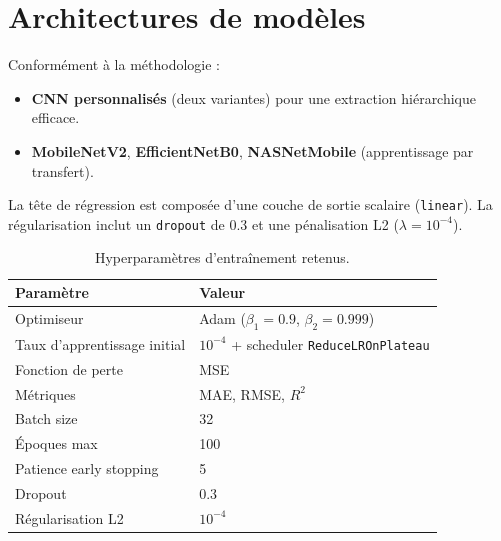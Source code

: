 \section{Architectures de modèles}
\label{sec:modeles}

Conformément à la méthodologie :
\begin{itemize}
	\item \textbf{CNN personnalisés} (deux variantes) pour une extraction hiérarchique efficace.
	\item \textbf{MobileNetV2}, \textbf{EfficientNetB0}, \textbf{NASNetMobile} (apprentissage par transfert).
\end{itemize}

La tête de régression est composée d’une couche de sortie scalaire (\texttt{linear}).
La régularisation inclut un \texttt{dropout} de 0.3 et une pénalisation L2 (\(\lambda=10^{-4}\)).

\begin{table}[h!]
	\centering
	\caption{Hyperparamètres d’entraînement retenus.}
	\label{tab:hyperparams}
	\begin{tabular}{l l}
		\toprule
		Paramètre                    & Valeur                                             \\ \midrule
		Optimiseur                   & Adam (\(\beta_1=0.9\), \(\beta_2=0.999\))          \\
		Taux d’apprentissage initial & \(10^{-4}\) + scheduler \texttt{ReduceLROnPlateau} \\
		Fonction de perte            & MSE                                                \\
		Métriques                    & MAE, RMSE, \(R^2\)                                 \\
		Batch size                   & 32                                                 \\
		Époques max                  & 100                                                \\
		Patience early stopping      & 5                                                  \\
		Dropout                      & 0.3                                                \\
		Régularisation L2            & \(10^{-4}\)                                        \\ \bottomrule
	\end{tabular}
\end{table}


